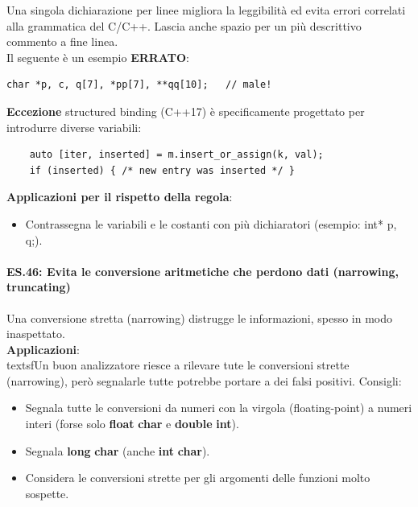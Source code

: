 \textsf{\small Una singola dichiarazione per linee migliora la leggibilità ed evita errori correlati alla grammatica del C/C++. Lascia anche spazio per un più descrittivo commento a fine linea. } \\

\textsf{\small Il seguente è un esempio \textbf{\color{red}ERRATO}\normalcolor: }

\begin{lstlisting}[frame=single, rulecolor=\color{red}]
	char *p, c, q[7], *pp[7], **qq[10];   // male!
\end{lstlisting}

\textsf{\small \textbf{Eccezione} structured binding (C++17) è specificamente progettato per introdurre diverse variabili: }

\begin{lstlisting}
	auto [iter, inserted] = m.insert_or_assign(k, val);
	if (inserted) { /* new entry was inserted */ }
\end{lstlisting}

\textsf{\small \textbf{Applicazioni per il rispetto della regola}: }

\begin{itemize}
	\item \textsf{\small Contrassegna le variabili e le costanti con più dichiaratori (esempio: int* p, q;).}
\end{itemize}

\paragraph{ES.46: Evita le conversione aritmetiche che perdono dati (narrowing, truncating)}

\textsf{\small Una conversione stretta (narrowing) distrugge le informazioni, spesso in modo inaspettato.} \\

\textsf{\small \textbf{Applicazioni}: } \\

textsf{\small Un buon analizzatore riesce a rilevare tute le conversioni strette (narrowing), però segnalarle tutte potrebbe portare a dei falsi positivi. Consigli: }

\begin{itemize}
	\item \textsf{\small  Segnala tutte le conversioni da numeri con la virgola (floating-point) a numeri interi (forse solo \textbf{float} \textrightarrow \textbf{char} e \textbf{double} \textrightarrow \textbf{int}).}
	\item \textsf{\small Segnala \textbf{long} \textrightarrow \textbf{char} (anche \textbf{int} \textrightarrow \textbf{char}).}
	\item \textsf{\small Considera le conversioni strette per gli argomenti delle funzioni molto sospette.}
\end{itemize}

